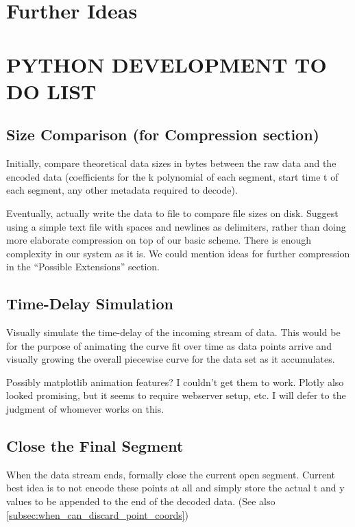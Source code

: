 \documentclass{article}
\begin{document}
\section{Further Ideas}


\section{PYTHON DEVELOPMENT TO DO LIST}

\subsection{Size Comparison (for Compression section)}
Initially, compare theoretical data sizes in bytes between the raw data and the encoded data (coefficients for the k polynomial of each segment, start time t of each segment, any other metadata required to decode).

Eventually, actually write the data to file to compare file sizes on disk. Suggest using a simple text file with spaces and newlines as delimiters, rather than doing more elaborate compression on top of our basic scheme. There is enough complexity in our system as it is.
We could mention ideas for further compression in the “Possible Extensions” section.

\subsection{Time-Delay Simulation}
Visually simulate the time-delay of the incoming stream of data. This would be for the purpose of animating the curve fit over time as data points arrive and visually growing the overall piecewise curve for the data set as it accumulates.

Possibly matplotlib animation features? I couldn’t get them to work. Plotly also looked promising, but it seems to require webserver setup, etc.
I will defer to the judgment of whomever works on this.


\subsection{Close the Final Segment}
\label{subsec:close_the_final_segment}
When the data stream ends, formally close the current open segment. Current best idea is to not encode these points at all and simply store the actual t and y values to be appended to the end of the decoded data. (See also \ref{subsec:when_can_discard_point_coords})
\end{document}

